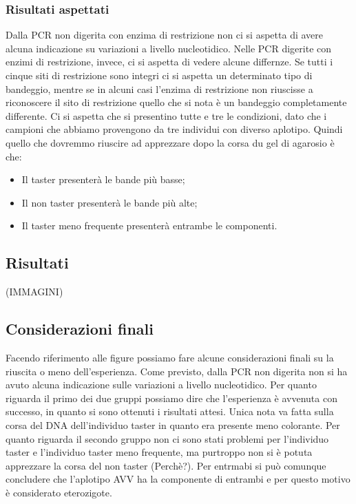 	    \subsubsection*{Risultati aspettati}
    
        Dalla PCR non digerita con enzima di restrizione non ci si aspetta di avere alcuna indicazione su variazioni a livello nucleotidico. 
        Nelle PCR digerite con enzimi di restrizione, invece, ci si aspetta di vedere alcune differnze. Se tutti i cinque siti di restrizione sono integri ci si aspetta un determinato tipo di bandeggio, mentre se in alcuni casi l'enzima di restrizione non riuscisse a riconoscere il sito di restrizione quello che si nota è un bandeggio completamente differente. 
        Ci si aspetta che si presentino tutte e tre le condizioni, dato che i campioni che abbiamo provengono da tre individui con diverso aplotipo. Quindi quello che dovremmo riuscire ad apprezzare dopo la corsa du gel di agarosio è che:
        \begin{itemize}
            \item Il taster presenterà le bande più basse; 
            \item Il non taster presenterà le bande più alte;
            \item Il taster meno frequente presenterà entrambe le componenti. 
        \end{itemize}
	
	\subsection*{Risultati}
	
		(IMMAGINI)

	\subsection*{Considerazioni finali}
	
	Facendo riferimento alle figure possiamo fare alcune considerazioni finali su la riuscita o meno dell'esperienza. 
	Come previsto, dalla PCR non digerita non si ha avuto alcuna indicazione sulle variazioni a livello nucleotidico.
	Per quanto riguarda il primo dei due gruppi possiamo dire che l'esperienza è avvenuta con successo, in quanto si sono ottenuti i risultati attesi. Unica nota va fatta sulla corsa del DNA dell'individuo taster in quanto era presente meno colorante. 
	Per quanto riguarda il secondo gruppo non ci sono stati problemi per l'individuo taster e l'individuo taster meno frequente, ma purtroppo non si è potuta apprezzare la corsa del non taster (Perchè?). 
	Per entrmabi si può comunque concludere che l'aplotipo AVV ha la componente di entrambi e per questo motivo è considerato eterozigote. 
